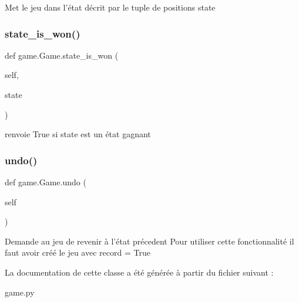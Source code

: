 \begin{DoxyVerb}Met le jeu dans l'état décrit par le tuple de positions state
\end{DoxyVerb}
 \mbox{\label{classgame_1_1Game_a9ae72edd1264e1effe875ec1af8051f9}} 
\subsubsection{\texorpdfstring{state\+\_\+is\+\_\+won()}{state\_is\_won()}}
{\footnotesize\ttfamily def game.\+Game.\+state\+\_\+is\+\_\+won (\begin{DoxyParamCaption}\item[{}]{self,  }\item[{}]{state }\end{DoxyParamCaption})}

\begin{DoxyVerb}renvoie True si state est un état gagnant
\end{DoxyVerb}
 \mbox{\label{classgame_1_1Game_a4d05280a8e739b214f50168a7f60c782}} 
\subsubsection{\texorpdfstring{undo()}{undo()}}
{\footnotesize\ttfamily def game.\+Game.\+undo (\begin{DoxyParamCaption}\item[{}]{self }\end{DoxyParamCaption})}

\begin{DoxyVerb}Demande au jeu de revenir à l'état précedent
Pour utiliser cette fonctionnalité il faut avoir créé le jeu avec record = True
\end{DoxyVerb}
 

La documentation de cette classe a été générée à partir du fichier suivant \+:\begin{DoxyCompactItemize}
\item 
game.\+py\end{DoxyCompactItemize}
